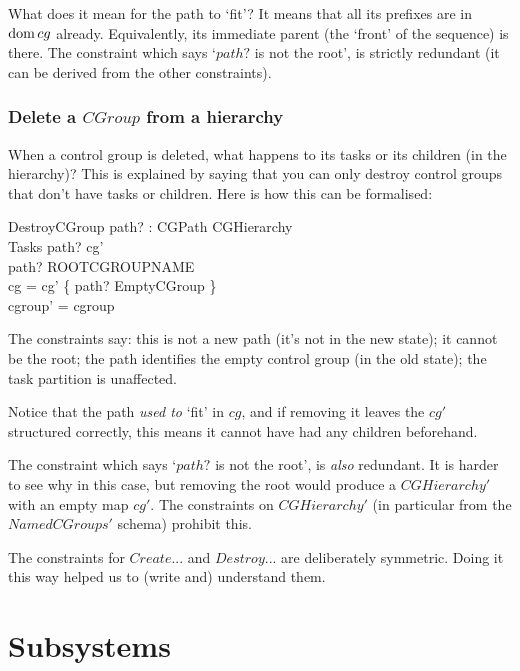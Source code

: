 \documentclass[a4paper,twoside,12pt]{article}
\begin{document}
What does it mean for the path to `fit'? It means that all its prefixes are in $\mathop{\mathrm{dom}} cg$ already. Equivalently, its immediate parent (the `front' of the sequence) is there.
The constraint which says `$path?$ is not the root', is strictly redundant (it can be derived from the other constraints).

\subsubsection{Delete a $CGroup$ from a hierarchy}

When a control group is deleted, what happens to its tasks or its children (in the hierarchy)?
This is explained by saying that you can only destroy control groups that don't have tasks or children.
Here is how this can be formalised:

\begin{schema}{DestroyCGroup}
path? : CGPath
\also
\Delta CGHierarchy \\
\Xi Tasks
\where
path? \notin \dom cg' \\
path? \neq ROOTCGROUPNAME \\
cg = cg' \cup \{ path? \mapsto EmptyCGroup \} \\
cgroup' = cgroup
\end{schema}
The constraints say: this is not a new path (it's not in the new state); it cannot be the root;
the path identifies the empty control group (in the old state); the task partition is unaffected.

Notice that the path \emph{used to} `fit' in $cg$, and if removing it leaves the $cg'$ structured correctly,
this means it cannot have had any children beforehand.

The constraint which says `$path?$ is not the root', is \emph{also} redundant.
It is harder to see why in this case, but removing the root would produce a $CGHierarchy'$ with an empty map $cg'$.
The constraints on $CGHierarchy'$ (in particular from the $NamedCGroups'$ schema) prohibit this.

The constraints for $Create$... and $Destroy$... are deliberately symmetric.
Doing it this way helped us to (write and) understand them.

\section{Subsystems}
\label{sec:ss}
\end{document}
